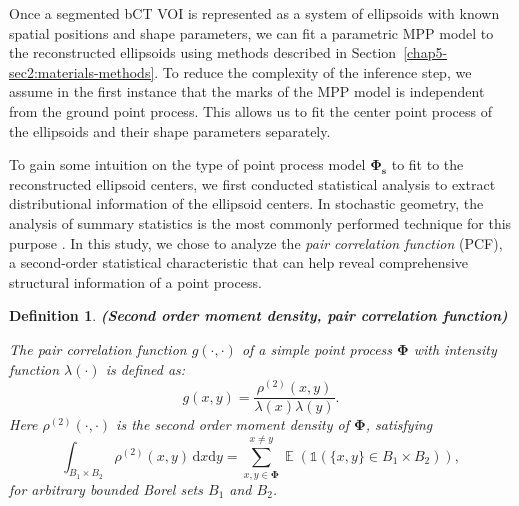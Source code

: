 \documentclass[journal]{IEEEtran}
\DeclareMathOperator{\E}{\mathbb{E}}%
\newcommand{\dd}[1]{\mathrm{d}#1}%
\newcommand{\sidenote}[1]{\textnormal{\textbf{(#1)}}}%
\newtheorem{define}{Definition}[section]%
\begin{document}
Once a segmented bCT VOI is represented as a system of ellipsoids with
known spatial positions and shape parameters, we can fit a parametric
MPP model to the reconstructed ellipsoids using methods described in
Section~\ref{chap5-sec2:materials-methods}. To reduce the complexity
of the inference step, we assume in the first instance that the marks
of the MPP model is independent from the ground point process. This
allows us to fit the center point process of the ellipsoids and their
shape parameters separately.


To gain some intuition on the type of point process model
$\mathbf{\Phi_s}$ to fit to the reconstructed ellipsoid centers, we
first conducted statistical analysis to extract distributional
information of the ellipsoid centers. In stochastic geometry, the
analysis of summary statistics is the most commonly performed
technique for this purpose \cite{chiu2013stochastic}. In this study,
we chose to analyze the \textit{pair correlation function} (PCF), a
second-order statistical characteristic that can help reveal
comprehensive structural information of a point process.

\begin{define} \sidenote{Second order moment density, pair correlation
    function} \textnormal{\cite[p34]{baddeley2007spatial}}

  The pair correlation function \textit{$g(\cdot, \cdot)$} of a simple
  point process $\mathbf{\Phi}$ with intensity function
  $\lambda(\cdot)$ is defined as:
  \begin{equation}
    \label{eq:pcf-official-def}
    g(x,y)=\frac{\rho^{(2)}(x,y)}{\lambda(x) \lambda(y)}.
  \end{equation}
  Here $\rho^{(2)}(\cdot, \cdot)$ is the second order moment density
  of $\mathbf{\Phi}$, satisfying
  \begin{equation}
    \label{eq:second-order-moment}
    \int_{B_{1} \times B_{2}} \rho^{(2)}(x,y) \, \dd x \dd y
    = \sum^{x \neq y}_{x,y \in \mathbf{\Phi}} \E \left( \mathds{1} (
      \{x,y \} \in B_{1} \times B_{2} ) \right),
  \end{equation}
  for arbitrary bounded Borel sets $B_1$ and $B_2$.
\end{define}
\end{document}
